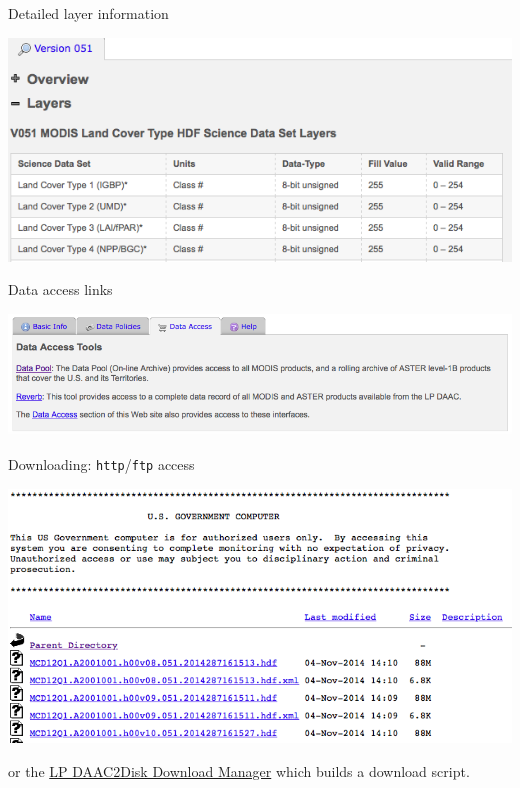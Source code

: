 \documentclass[ignorenonframetext,]{beamer}
\begin{document}
\begin{frame}{Detailed layer information}

\includegraphics{assets/lpdaac3.png}

\end{frame}

\begin{frame}{Data access links}

\includegraphics{assets/lpdaac4.png}

\end{frame}

\begin{frame}{Downloading: \texttt{http}/\texttt{ftp} access}

\includegraphics{assets/lpdaac5.png}

or the
\href{https://lpdaac.usgs.gov/sites/default/files/public/datapool/DAAC2DiskUserGuide.pdf}{LP
DAAC2Disk Download Manager} which builds a download script.

\end{frame}
\end{document}
